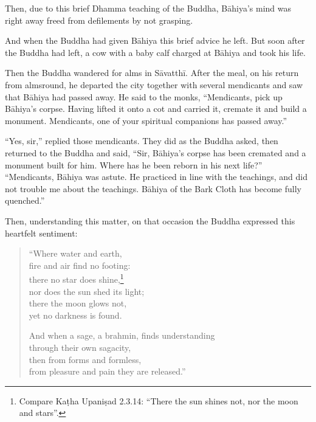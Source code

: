 \documentclass[12pt,openany]{book}%
\begin{document}
Then, due to this brief Dhamma teaching of the Buddha, \textsanskrit{Bāhiya}’s mind was right away freed from defilements by not grasping. 

And when the Buddha had given \textsanskrit{Bāhiya} this brief advice he left. But soon after the Buddha had left, a cow with a baby calf charged at \textsanskrit{Bāhiya} and took his life. 

Then the Buddha wandered for alms in \textsanskrit{Sāvatthī}. After the meal, on his return from almsround, he departed the city together with several mendicants and saw that \textsanskrit{Bāhiya} had passed away. He said to the monks, “Mendicants, pick up \textsanskrit{Bāhiya}’s corpse. Having lifted it onto a cot and carried it, cremate it and build a monument. Mendicants, one of your spiritual companions has passed away.” 

“Yes, sir,” replied those mendicants. They did as the Buddha asked, then returned to the Buddha and said, “Sir, \textsanskrit{Bāhiya}’s corpse has been cremated and a monument built for him. Where has he been reborn in his next life?” “Mendicants, \textsanskrit{Bāhiya} was astute. He practiced in line with the teachings, and did not trouble me about the teachings. \textsanskrit{Bāhiya} of the Bark Cloth has become fully quenched.” 

Then, understanding this matter, on that occasion the Buddha expressed this heartfelt sentiment: 

\begin{verse}%
“Where water and earth, \\
fire and air find no footing: \\
there no star does shine,\footnote{Compare \textsanskrit{Kaṭha} \textsanskrit{Upaniṣad} 2.3.14: “There the sun shines not, nor the moon and stars”. } \\
nor does the sun shed its light; \\
there the moon glows not, \\
yet no darkness is found. 

And when a sage, a brahmin, finds understanding \\
through their own sagacity, \\
then from forms and formless, \\
from pleasure and pain they are released.” 

%
\end{verse}
\end{document}
